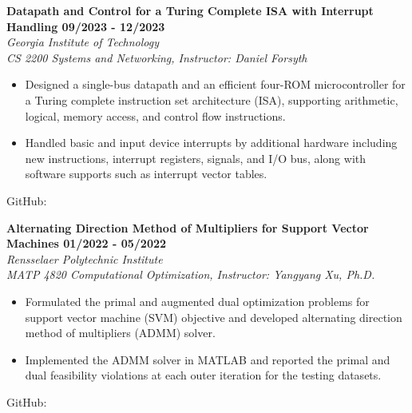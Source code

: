 \documentclass[letterpaper, 11pt]{article}
\newcommand{\subsectionvspace}{\vspace{8pt}}
\begin{document}


    \textbf{Datapath and Control for a Turing Complete ISA with Interrupt Handling \hfill 09/2023 - 12/2023} \\
    \textit{Georgia Institute of Technology} \\
    \textit{CS 2200 Systems and Networking, Instructor: Daniel Forsyth}
    \begin{itemize}
        \item Designed a single-bus datapath and an efficient four-ROM microcontroller for a Turing complete instruction set architecture (ISA), supporting arithmetic, logical, memory access, and control flow instructions.
        \item Handled basic and input device interrupts by additional hardware including new instructions, interrupt registers, signals, and I/O bus, along with software supports such as interrupt vector tables.
    \end{itemize}
    GitHub: \href{https://github.com/tianrui-qi/LC2222a-ISA}{}

    \subsectionvspace

    \textbf{Alternating Direction Method of Multipliers for Support Vector Machines \hfill 01/2022 - 05/2022} \\
    \textit{Rensselaer Polytechnic Institute} \\
    \textit{MATP 4820 Computational Optimization, Instructor: Yangyang Xu, Ph.D.}
    \begin{itemize}
        \item Formulated the primal and augmented dual optimization problems for support vector machine (SVM) objective and developed alternating direction method of multipliers (ADMM) solver.
        \item Implemented the ADMM solver in MATLAB and reported the primal and dual feasibility violations at each outer iteration for the testing datasets.
    \end{itemize}
    GitHub: \href{https://github.com/tianrui-qi/ADMM-for-SVM}{}
\end{document}
